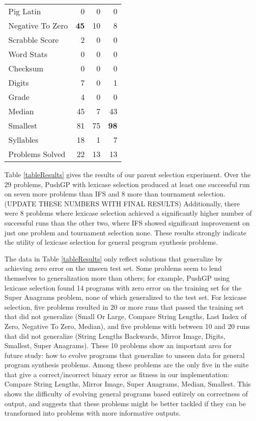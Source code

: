 \documentclass{sig-alternate}
\begin{document}
\begin{table}[t]
\begin{tabular}{|l|rrr|}
Pig Latin                  & 0        & 0       & 0   \\
Negative To Zero           & \textbf{45}       & 10      & 8   \\
Scrabble Score             & 2        & 0       & 0    \\
Word Stats                 & 0        & 0       &  0   \\
Checksum                   & 0         & 0        & 0    \\
Digits                     & 7        & 0       & 1   \\
Grade                      & 4        & 0       & 0   \\
Median                     & 45       & 7       & 43  \\
Smallest                   & 81       & 75      & \textbf{98}  \\
Syllables                  & 18       & 1       & 7   \\
\hline
Problems Solved          & 22       & 13      & 13   \\
\hline
\end{tabular}
\end{table}


Table \ref{tableResults} gives the results of our parent selection experiment. Over the 29 problems, PushGP with lexicase selection produced at least one successful run on seven more problems than IFS and 8 more than tournament selection.
(UPDATE THESE NUMBERS WITH FINAL RESULTS)
Additionally, there were 8 problems where lexicase selection achieved a significantly higher number of successful runs than the other two, where IFS showed significant improvement on just one problem and tournament selection none. These results strongly indicate the utility of lexicase selection for general program synthesis problems.

The data in Table \ref{tableResults} only reflect solutions that generalize by achieving zero error on the unseen test set. Some problems seem to lend themselves to generalization more than others; for example, PushGP using lexicase selection found 14 programs with zero error on the training set for the Super Anagrams problem, none of which generalized to the test set. For lexicase selection, five problems resulted in 20 or more runs that passed the training set that did not generalize (Small Or Large,
Compare String Lengths,
Last Index of Zero,
Negative To Zero,
Median),
and five problems with between 10 and 20 runs that did not generalize (String Lengths Backwards,
Mirror Image,
Digits,
Smallest,
Super Anagrams).
These 10 problems show an important area for future study: how to evolve programs that generalize to unseen data for general program synthesis problems. Among these problems are the only five in the suite that give a correct/incorrect binary error as fitness in our implementation: Compare String Lengths, Mirror Image, Super Anagrams, Median, Smallest. This shows the difficulty of evolving general programs based entirely on correctness of output, and suggests that these problems might be better tackled if they can be transformed into problems with more informative outputs.
\end{document}
